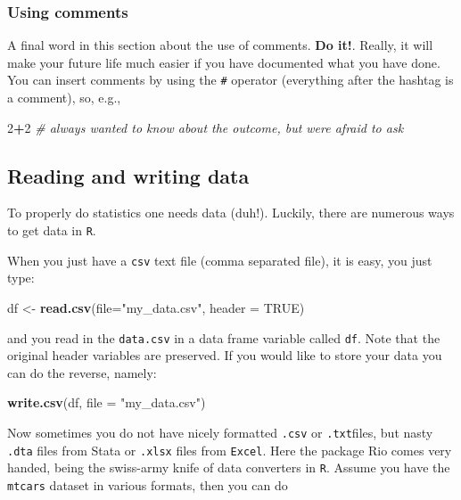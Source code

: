 \documentclass[]{article}
\newenvironment{Shaded}{\begin{snugshade}}{\end{snugshade}}
\newcommand{\KeywordTok}[1]{\textcolor[rgb]{0.13,0.29,0.53}{\textbf{#1}}}
\newcommand{\DataTypeTok}[1]{\textcolor[rgb]{0.13,0.29,0.53}{#1}}
\newcommand{\DecValTok}[1]{\textcolor[rgb]{0.00,0.00,0.81}{#1}}
\newcommand{\StringTok}[1]{\textcolor[rgb]{0.31,0.60,0.02}{#1}}
\newcommand{\CommentTok}[1]{\textcolor[rgb]{0.56,0.35,0.01}{\textit{#1}}}
\newcommand{\OtherTok}[1]{\textcolor[rgb]{0.56,0.35,0.01}{#1}}
\newcommand{\OperatorTok}[1]{\textcolor[rgb]{0.81,0.36,0.00}{\textbf{#1}}}
\newcommand{\NormalTok}[1]{#1}
\theoremstyle{definition}
\theoremstyle{definition}
\theoremstyle{definition}
\theoremstyle{remark}
\begin{document}
\subsubsection{Using comments}\label{using-comments}

A final word in this section about the use of comments. \textbf{Do it!}.
Really, it will make your future life much easier if you have documented
what you have done. You can insert comments by using the \texttt{\#}
operator (everything after the hashtag is a comment), so, e.g.,

\begin{Shaded}
\begin{Highlighting}[]
\DecValTok{2}\OperatorTok{+}\DecValTok{2} \CommentTok{# always wanted to know about the outcome, but were afraid to ask}
\end{Highlighting}
\end{Shaded}

\subsection{Reading and writing data}\label{reading-and-writing-data}

To properly do statistics one needs data (duh!). Luckily, there are
numerous ways to get data in \texttt{R}.

When you just have a \texttt{csv} text file (comma separated file), it
is easy, you just type:

\begin{Shaded}
\begin{Highlighting}[]
\NormalTok{df <-}\StringTok{ }\KeywordTok{read.csv}\NormalTok{(}\DataTypeTok{file=}\StringTok{"my_data.csv"}\NormalTok{, }\DataTypeTok{header =} \OtherTok{TRUE}\NormalTok{)}
\end{Highlighting}
\end{Shaded}

and you read in the \texttt{data.csv} in a data frame variable called
\texttt{df}. Note that the original header variables are preserved. If
you would like to store your data you can do the reverse, namely:

\begin{Shaded}
\begin{Highlighting}[]
\KeywordTok{write.csv}\NormalTok{(df, }\DataTypeTok{file =} \StringTok{"my_data.csv"}\NormalTok{)}
\end{Highlighting}
\end{Shaded}

Now sometimes you do not have nicely formatted \texttt{.csv} or
\texttt{.txt}files, but nasty \texttt{.dta} files from Stata or
\texttt{.xlsx} files from \texttt{Excel}. Here the package Rio comes
very handed, being the swiss-army knife of data converters in
\texttt{R}. Assume you have the \texttt{mtcars} dataset in various
formats, then you can do
\end{document}
